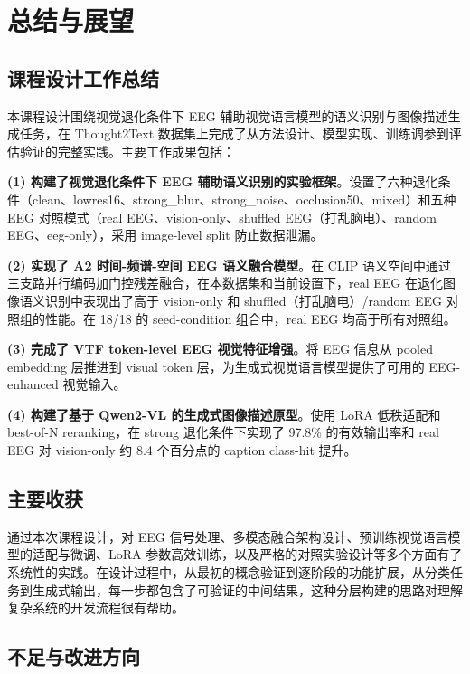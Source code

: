 \section{总结与展望}

\subsection{课程设计工作总结}

本课程设计围绕视觉退化条件下 EEG 辅助视觉语言模型的语义识别与图像描述生成任务，在 Thought2Text 数据集上完成了从方法设计、模型实现、训练调参到评估验证的完整实践。主要工作成果包括：

\textbf{(1) 构建了视觉退化条件下 EEG 辅助语义识别的实验框架}。设置了六种退化条件（clean、lowres16、strong\_blur、strong\_noise、occlusion50、mixed）和五种 EEG 对照模式（real EEG、vision-only、shuffled EEG（打乱脑电）、random EEG、eeg-only），采用 image-level split 防止数据泄漏。

\textbf{(2) 实现了 A2 时间-频谱-空间 EEG 语义融合模型}。在 CLIP 语义空间中通过三支路并行编码加门控残差融合，在本数据集和当前设置下，real EEG 在退化图像语义识别中表现出了高于 vision-only 和 shuffled（打乱脑电）/random EEG 对照组的性能。在 18/18 的 seed-condition 组合中，real EEG 均高于所有对照组。

\textbf{(3) 完成了 VTF token-level EEG 视觉特征增强}。将 EEG 信息从 pooled embedding 层推进到 visual token 层，为生成式视觉语言模型提供了可用的 EEG-enhanced 视觉输入。

\textbf{(4) 构建了基于 Qwen2-VL 的生成式图像描述原型}。使用 LoRA 低秩适配和 best-of-N reranking，在 strong 退化条件下实现了 97.8\% 的有效输出率和 real EEG 对 vision-only 约 8.4 个百分点的 caption class-hit 提升。

\subsection{主要收获}

通过本次课程设计，对 EEG 信号处理、多模态融合架构设计、预训练视觉语言模型的适配与微调、LoRA 参数高效训练，以及严格的对照实验设计等多个方面有了系统性的实践。在设计过程中，从最初的概念验证到逐阶段的功能扩展，从分类任务到生成式输出，每一步都包含了可验证的中间结果，这种分层构建的思路对理解复杂系统的开发流程很有帮助。

\subsection{不足与改进方向}

